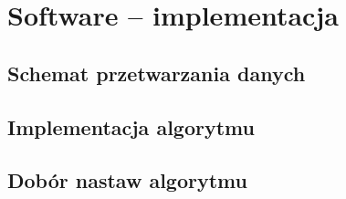 \chapter{Software -- implementacja}
\label{cha:software}



\section{Schemat przetwarzania danych}
\section{Implementacja algorytmu}

\section{Dobór nastaw algorytmu}